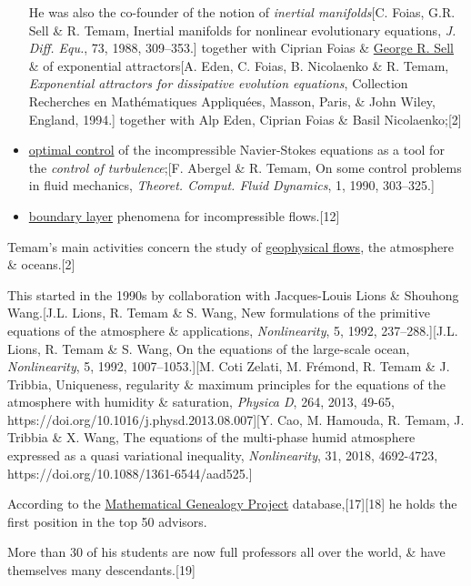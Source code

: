 \documentclass{article}
\begin{document}
\begin{itemize}
	He was also the co-founder of the notion of \textit{inertial manifolds}[C. Foias, G.R. Sell \& R. Temam, Inertial manifolds for nonlinear evolutionary equations, \textit{J. Diff. Equ.}, 73, 1988, 309--353.] together with Ciprian Foias \& \href{https://en.wikipedia.org/wiki/George_R._Sell}{George R. Sell} \& of exponential attractors[A. Eden, C. Foias, B. Nicolaenko \& R. Temam, \textit{Exponential attractors for dissipative evolution equations}, Collection Recherches en Mathématiques Appliquées, Masson, Paris, \& John Wiley, England, 1994.] together with Alp Eden, Ciprian Foias \& Basil Nicolaenko;[2]
	\item \href{https://en.wikipedia.org/wiki/Optimal_control}{optimal control} of the incompressible Navier-Stokes equations as a tool for the \textit{control of turbulence};[F. Abergel \& R. Temam, On some control problems in fluid mechanics, \textit{Theoret. Comput. Fluid Dynamics}, 1, 1990, 303--325.]
	\item \href{https://en.wikipedia.org/wiki/Boundary_layer}{boundary layer} phenomena for incompressible flows.[12]
\end{itemize}
Temam's main activities concern the study of \href{https://en.wikipedia.org/wiki/Geophysical_fluid_dynamics}{geophysical flows}, the atmosphere \& oceans.[2]

This started in the 1990s by collaboration with Jacques-Louis Lions \& Shouhong Wang.[J.L. Lions, R. Temam \& S. Wang, New formulations of the primitive equations of the atmosphere \& applications, \textit{Nonlinearity}, 5, 1992, 237--288.][J.L. Lions, R. Temam \& S. Wang, On the equations of the large-scale ocean, \textit{Nonlinearity}, 5, 1992, 1007--1053.][M. Coti Zelati, M. Frémond, R. Temam \& J. Tribbia, Uniqueness, regularity \& maximum principles for the equations of the atmosphere with humidity \& saturation, \textit{Physica D}, 264, 2013, 49-65, https://doi.org/10.1016/j.physd.2013.08.007][Y. Cao, M. Hamouda, R. Temam, J. Tribbia \& X. Wang, The equations of the multi-phase humid atmosphere expressed as a quasi variational inequality, \textit{Nonlinearity}, 31, 2018, 4692-4723, https://doi.org/10.1088/1361-6544/aad525.]

%
According to the \href{https://en.wikipedia.org/wiki/Mathematical_Genealogy_Project}{Mathematical Genealogy Project} database,[17][18] he holds the first position in the top 50 advisors.

More than 30 of his students are now full professors all over the world, \& have themselves many descendants.[19]
\end{document}
